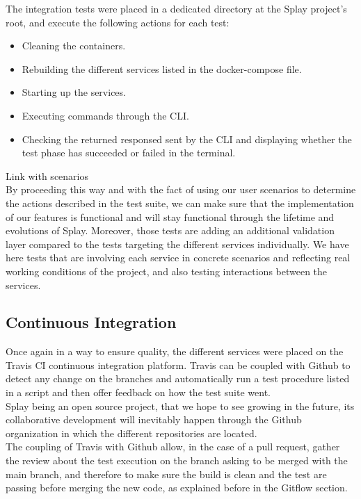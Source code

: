 \documentclass{eplmastersthesis}
\begin{document}
        The integration tests were placed in a dedicated directory at the Splay
        project's root, and execute the following actions for each test:

        \begin{itemize}
          \item Cleaning the containers.
          \item Rebuilding the different services listed in the docker-compose
          file.
          \item Starting up the services.
          \item Executing commands through the CLI.
          \item Checking the returned responsed sent by the CLI and displaying
          whether the test phase has succeeded or failed in the terminal.
        \end{itemize}

        {\color{red} Link with scenarios}\\

        By proceeding this way and with the fact of using our user scenarios to
        determine the actions described in the test suite, we can make sure
        that the implementation of our features is functional and will stay
        functional through the lifetime and evolutions of Splay. Moreover, those
        tests are adding an additional validation layer compared to the tests
        targeting the different services individually. We have here tests that
        are involving each service in concrete scenarios and reflecting real
        working conditions of the project, and also testing interactions
        between the services.

      \subsection{Continuous Integration}

        Once again in a way to ensure quality, the different services were placed
        on the Travis CI \cite{travis} continuous integration platform. Travis
        can be coupled with Github to detect any change on the branches and
        automatically run a test procedure listed in a script and then offer
        feedback on how the test suite went.\\

        Splay being an open source project, that we hope to see growing in the
        future, its collaborative development will inevitably happen through
        the Github organization in which the different repositories are located.\\
        The coupling of Travis with Github allow, in the case of a pull request,
        gather the review about the test execution on the branch asking to be
        merged with the main branch, and therefore to make sure the build is
        clean and the test are passing before merging the new code, as
        explained before in the Gitflow section.
\end{document}
